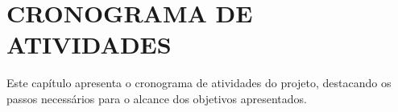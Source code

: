 
\chapter{CRONOGRAMA DE ATIVIDADES}
\label{chap:cronograma}

Este capítulo apresenta o cronograma de atividades do projeto, destacando os passos necessários para o alcance dos objetivos apresentados.

\begin{table}[htb]
\end{table}
 
